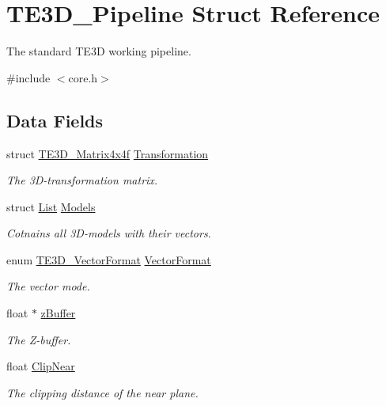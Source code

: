 \hypertarget{struct_t_e3_d___pipeline}{\section{T\-E3\-D\-\_\-\-Pipeline Struct Reference}
\label{struct_t_e3_d___pipeline}
}


The standard T\-E3\-D working pipeline.  




{\ttfamily \#include $<$core.\-h$>$}

\subsection*{Data Fields}
\begin{DoxyCompactItemize}
\item 
struct \hyperlink{struct_t_e3_d___matrix4x4f}{T\-E3\-D\-\_\-\-Matrix4x4f} \hyperlink{struct_t_e3_d___pipeline_a18ddbbc6401acb6e43259850e1e581ef}{Transformation}
\begin{DoxyCompactList}\small\item\em The 3\-D-\/transformation matrix. \end{DoxyCompactList}\item 
struct \hyperlink{struct_list}{List} \hyperlink{struct_t_e3_d___pipeline_a83a7e2814c3565a16a3f99d0fe61d130}{Models}
\begin{DoxyCompactList}\small\item\em Cotnains all 3\-D-\/models with their vectors. \end{DoxyCompactList}\item 
enum \hyperlink{models_8h_a68e3f605ef2dc9e35776b9c37f15495a}{T\-E3\-D\-\_\-\-Vector\-Format} \hyperlink{struct_t_e3_d___pipeline_a422631c708e3e0e6bb3bf305e9914418}{Vector\-Format}
\begin{DoxyCompactList}\small\item\em The vector mode. \end{DoxyCompactList}\item 
float $\ast$ \hyperlink{struct_t_e3_d___pipeline_a627615edd455b5791a70b97c531d8942}{z\-Buffer}
\begin{DoxyCompactList}\small\item\em The Z-\/buffer. \end{DoxyCompactList}\item 
float \hyperlink{struct_t_e3_d___pipeline_a03426847bd37f9f0b28bc8da33d4db9d}{Clip\-Near}
\begin{DoxyCompactList}\small\item\em The clipping distance of the near plane. \end{DoxyCompactList}\item 

\end{DoxyCompactItemize}
